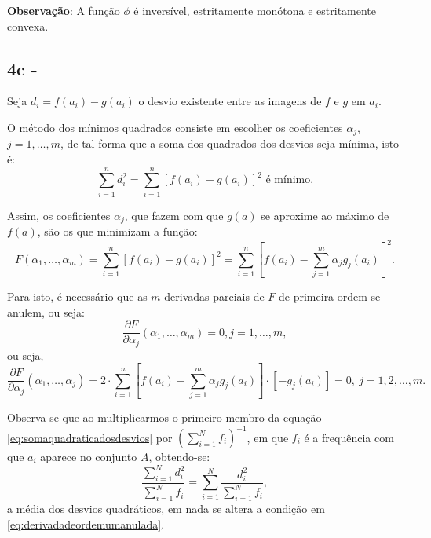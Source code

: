 {\textbf{Observação}: A função \(\phi\) é inversível, estritamente monótona e estritamente convexa.





\subsection*{4c - } %


Seja \(d_i = f(a_i)-g(a_i)\) o desvio existente entre as imagens de \(f\) e \(g\) em \(a_i\).

O método dos mínimos quadrados consiste em escolher os coeficientes \(\alpha_j\), \(j = 1, \ldots, m\), de tal forma que a soma dos quadrados dos desvios seja mínima, isto é:
\begin{equation}\label{eq:somaquadraticadosdesvios}
\displaystyle\sum_{i=1}^{n} d_i^2 = \displaystyle\sum_{i=1}^{n} [f(a_i) - g(a_i)]^2 \mbox{ é mínimo}.
\end{equation}

Assim, os coeficientes \(\alpha_j\), que fazem com que \(g(a)\) se aproxime ao máximo de \(f(a)\), são os que minimizam a função:
\[F(\alpha_1, \ldots, \alpha_m) = \displaystyle\sum_{i=1}^{n} [f(a_i) - g(a_i)]^2 = \displaystyle\sum_{i=1}^{n} \left[f(a_i) - \displaystyle\sum_{j=1}^{m} \alpha_j g_j(a_i)\right]^2.\]

Para isto, é necessário que as \(m\) derivadas parciais de \(F\) de primeira ordem se anulem, ou seja:
\begin{equation}\label{eq:derivadadeordemumanulada}
\dfrac{\partial F}{\partial \alpha_j}(\alpha_1, \ldots, \alpha_m) = 0, j = 1, \ldots, m,
\end{equation}
ou seja,
\[\dfrac{\partial F}{\partial \alpha_j}(\alpha_1, \ldots, \alpha_j) = 2 \cdot \displaystyle\sum_{i=1}^{n} \left[f(a_i) - \displaystyle\sum_{j=1}^{m} \alpha_j g_j(a_i)\right] \cdot \left[-g_j(a_i)\right] = 0,\ j = 1, 2, \ldots, m.\]

Observa-se que ao multiplicarmos o primeiro membro da equação \eqref{eq:somaquadraticadosdesvios} por \(\left(\displaystyle\sum_{i=1}^{N} f_i\right)^{-1}\), em que \(f_i\) é a frequência com que \(a_i\) aparece no conjunto \(A\), obtendo-se:
\begin{equation}\label{eq:mediaquadraticadosdesvios}
\dfrac{\displaystyle \sum_{i=1}^{N} d_i^2}{\displaystyle \sum_{i=1}^{N}f_i} = \displaystyle \sum_{i=1}^{N} \dfrac{d_i^2}{\displaystyle \sum_{i=1}^{N} f_i},
\end{equation}
a média dos desvios quadráticos, em nada se altera a condição em \eqref{eq:derivadadeordemumanulada}.









}

